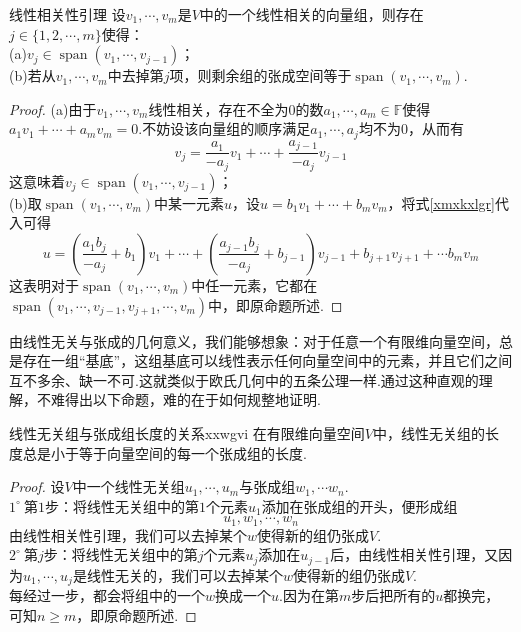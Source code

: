 \documentclass[lang=cn, zihao=5]{elegantbook}
\newcommand{\ssb}[1]{\left( #1 \right)}
\newcommand{\F}{\mathbb{F}}
\newcommand{\buzhou}[1]{$#1^{\circ} \ $}
\DeclareMathOperator{\spn}{span}
\begin{document}
\begin{proposition}{线性相关性引理}
	设$v_1, \cdots ,v_m$是$V$中的一个线性相关的向量组，则存在$j \in \{ 1,2, \cdots ,m \}$使得： \\
	(a)$v_j \in \spn (v_1, \cdots , v_{j-1})$； \\
	(b)若从$v_1, \cdots ,v_m$中去掉第$j$项，则剩余组的张成空间等于$\spn (v_1, \cdots ,v_m)$.
\end{proposition}
\begin{proof}
	(a)由于$v_1, \cdots ,v_m$线性相关，存在不全为$0$的数$a_1, \cdots ,a_m \in \F$使得$a_1v_1 + \cdots + a_mv_m = 0$.不妨设该向量组的顺序满足$a_1, \cdots ,a_j$均不为$0$，从而有
	\begin{equation}
		v_j = \frac{a_1}{-a_j} v_1 + \cdots + \frac{a_{j-1}}{-a_j} v_{j-1} \label{xmxkxlgr}
	\end{equation}
	这意味着$v_j \in \spn (v_1, \cdots , v_{j-1})$； \\
	(b)取$\spn (v_1, \cdots ,v_m)$中某一元素$u$，设$u=b_1v_1 + \cdots + b_mv_m$，将式\ref{xmxkxlgr}代入可得
	$$u = \ssb{\frac{a_1b_j}{-a_j}+b_1}v_1 + \cdots + \ssb{\frac{a_{j-1}b_j}{-a_j}+b_{j-1}}v_{j-1} + b_{j+1} v_{j+1} + \cdots b_mv_m$$
	这表明对于$\spn (v_1, \cdots ,v_m)$中任一元素，它都在$\spn (v_1, \cdots ,v_{j-1} , v_{j+1}, \cdots ,v_m)$中，即原命题所述.
\end{proof}

由线性无关与张成的几何意义，我们能够想象：对于任意一个有限维向量空间，总是存在一组“基底”，这组基底可以线性表示任何向量空间中的元素，并且它们之间互不多余、缺一不可.这就类似于欧氏几何中的五条公理一样.通过这种直观的理解，不难得出以下命题，难的在于如何规整地证明.

\begin{proposition}{线性无关组与张成组长度的关系}{xxwgvi}
	在有限维向量空间$V$中，线性无关组的长度总是小于等于向量空间的每一个张成组的长度.
\end{proposition}
\begin{proof}
	设$V$中一个线性无关组$u_1, \cdots ,u_m$与张成组$w_1, \cdots w_n$. \\
	\buzhou{1}第$1$步：将线性无关组中的第$1$个元素$u_1$添加在张成组的开头，便形成组$$u_1,w_1, \cdots ,w_n$$
	由线性相关性引理，我们可以去掉某个$w$使得新的组仍张成$V$. \\
	\buzhou{2}第$j$步：将线性无关组中的第$j$个元素$u_j$添加在$u_{j-1}$后，由线性相关性引理，又因为$u_1, \cdots ,u_j$是线性无关的，我们可以去掉某个$w$使得新的组仍张成$V$. \\
	每经过一步，都会将组中的一个$w$换成一个$u$.因为在第$m$步后把所有的$u$都换完，可知$n \geq m$，即原命题所述.
\end{proof}
\end{document}
